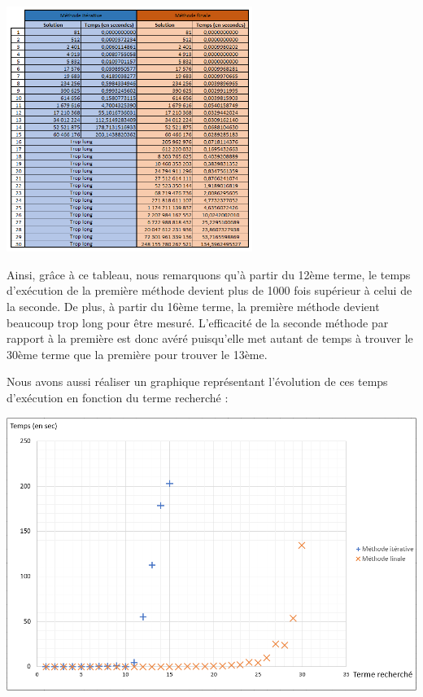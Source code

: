 \documentclass{article}
\begin{document}
\bigbreak
\begin{center}
\includegraphics[width = 8cm]{Image/Tableau.png}
\end{center}
\bigbreak

Ainsi, grâce à ce tableau, nous remarquons qu'à partir du 12ème terme, le temps d'exécution de la première méthode devient plus de 1000 fois supérieur à celui de la seconde. De plus, à partir du 16ème terme, la première méthode devient beaucoup trop long pour être mesuré. L'efficacité de la seconde méthode par rapport à la première est donc avéré puisqu'elle met autant de temps à trouver le 30ème terme que la première pour trouver le 13ème.

Nous avons aussi réaliser un graphique représentant l'évolution de ces temps d'exécution en fonction du terme recherché :

\bigbreak
\begin{center}
\includegraphics[scale = 0.5]{Image/Graphe.png}
\end{center}
\bigbreak
\end{document}

